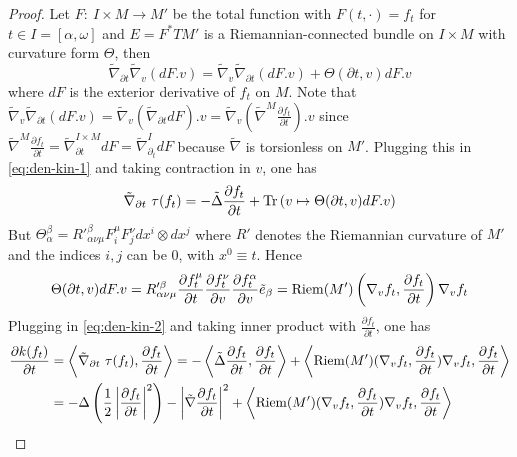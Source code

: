 \begin{proof}
Let \(F:\ I\times M \longrightarrow M'\) be the total function with \(F(t,\cdot)
= f_t\) for \(t\in I =[\alpha,\omega]\) and \(E = F^* TM'\) is a Riemannian-connected bundle on \(I\times M\) with curvature form \(\Theta\), then
\begin{equation}
\label{eq:den-kin-1}
\tilde \nabla_{\partial t} \tilde\nabla_v (dF.v) = \tilde\nabla_v \tilde\nabla_{\partial t} (dF.v) + \Theta(\partial t, v) dF.v
\end{equation}
where \(dF\) is the exterior derivative of \(f_t\) on \(M\). Note that \(\tilde \nabla_v \tilde \nabla_{\partial t} (dF.v) = \tilde \nabla_v (\tilde
\nabla_{\partial t} dF).v = \tilde \nabla_v (\tilde\nabla^M \frac{\partial f_t}{\partial
t}).v\) since \(\tilde\nabla^M \frac{\partial f_t}{\partial t}= \tilde\nabla_{\partial
t}^{I\times M} dF = \tilde\nabla^{I}_{\partial_t}dF\) because
\(\tilde \nabla\) is torsionless on \(M'\). Plugging this in \eqref{eq:den-kin-1} and taking contraction
in \(v\), one has
\begin{equation}
\label{eq:den-kin-2}
 \tilde \nabla_{\partial t}\ \tau(f_t) = -\tilde \Delta \frac{\partial f_t}{\partial t} +
\mathop{\rm Tr}\nolimits \left( v\mapsto \Theta (\partial t,v) dF.v\right)
\end{equation}
But \(\Theta^\beta_\alpha = R'^\beta_{\alpha\nu\mu} F^\mu_i F^\nu_j dx^i\otimes dx^j\)
where \(R'\) denotes the Riemannian curvature of \(M'\) and the indices \(i,j\) can
be \(0\), with \(x^0 \equiv t\). Hence 
\[
 \Theta (\partial t, v) dF.v = R'^\beta_{\alpha \nu \mu} \frac{\partial f^\mu_t}{\partial
t}\frac{\partial f_t^\nu}{\partial v} \frac{\partial f_t^\alpha}{\partial v} \tilde
e_\beta = \mathop{\rm Riem}\nolimits(M')\left(\nabla_v f_t, \frac{\partial f_t}{\partial t}\right)\nabla_v f_t
\]
Plugging in \eqref{eq:den-kin-2} and taking inner product with \(\frac{\partial
f_t}{\partial t}\), one has
\begin{align*}
 \frac{\partial k(f_t)}{\partial t} &= \left\langle \tilde \nabla_{\partial t}\ \tau(f_t),
\frac{\partial f_t}{\partial t} \right \rangle = - \left\langle \tilde \Delta \frac{\partial
f_t}{\partial t}, \frac{\partial f_t}{\partial t} \right\rangle + \left \langle \mathop{\rm Riem}\nolimits(M')
(\nabla_v f_t, \frac{\partial f_t}{\partial t}) \nabla_v f_t, \frac{\partial f_t}{\partial
t} \right \rangle  \\
   &= - \Delta \left(\frac{1}{2} \left|\frac{\partial f_t}{\partial t}\right|^2\right) - \left| \tilde \nabla \frac{\partial f_t}{\partial t}\right|^2 + \left \langle \mathop{\rm Riem}\nolimits(M')
(\nabla_v f_t, \frac{\partial f_t}{\partial t}) \nabla_v f_t, \frac{\partial f_t}{\partial
t} \right \rangle
\end{align*}
\end{proof}

